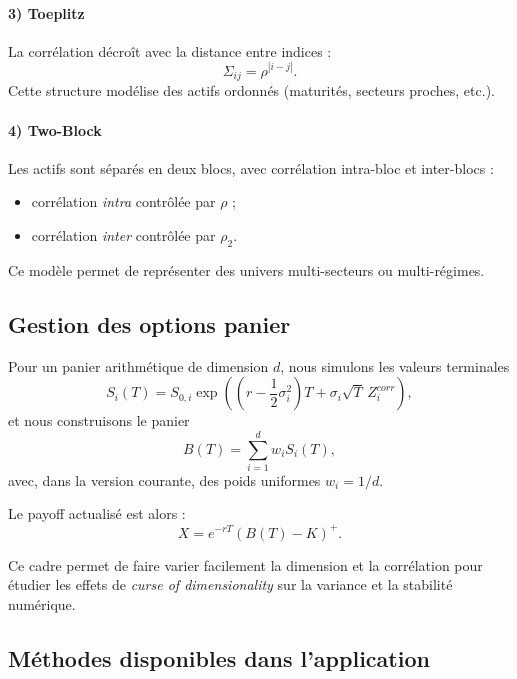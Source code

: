 ﻿\documentclass[11pt,a4paper]{article}
\begin{document}
\paragraph{3) Toeplitz}
La corrélation décroît avec la distance entre indices :
\begin{equation}
\Sigma_{ij} = \rho^{|i-j|}.
\end{equation}
Cette structure modélise des actifs ordonnés (maturités, secteurs proches, etc.).

\paragraph{4) Two-Block}
Les actifs sont séparés en deux blocs, avec corrélation intra-bloc et inter-blocs :
\begin{itemize}
    \item corrélation \textit{intra} contrôlée par $\rho$ ;
    \item corrélation \textit{inter} contrôlée par $\rho_2$.
\end{itemize}
Ce modèle permet de représenter des univers multi-secteurs ou multi-régimes.

\subsection{Gestion des options panier}

Pour un panier arithmétique de dimension $d$, nous simulons les valeurs terminales
\begin{equation}
S_i(T) = S_{0,i}\exp\left(\left(r - \frac{1}{2}\sigma_i^2\right)T + \sigma_i\sqrt{T}\,Z_i^{corr}\right),
\end{equation}
et nous construisons le panier
\begin{equation}
B(T) = \sum_{i=1}^d w_i S_i(T),
\end{equation}
avec, dans la version courante, des poids uniformes $w_i = 1/d$.

Le payoff actualisé est alors :
\begin{equation}
X = e^{-rT}(B(T)-K)^+.
\end{equation}

Ce cadre permet de faire varier facilement la dimension et la corrélation pour étudier les effets de \textit{curse of dimensionality} sur la variance et la stabilité numérique.

\subsection{Méthodes disponibles dans l'application}
\end{document}
